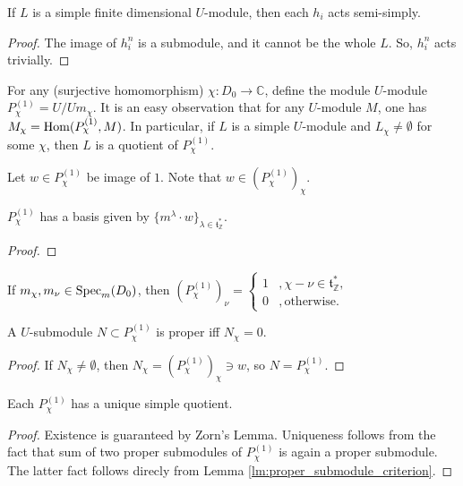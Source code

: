 \begin{corollary}
If $L$ is a simple finite dimensional $U$-module, then each $h_i$ acts semi-simply.
\end{corollary}

\begin{proof}
The image of $h_i^n$ is a submodule, and it cannot be the whole $L$. So, $h_i^n$ acts trivially.
\end{proof}

For any (surjective homomorphism) $\chi:D_0\to \mathbb{C}$, define the module $U$-module $P^{(1)}_\chi=U/Um_\chi$.
It is an easy observation that for any $U$-module $M$, one has $M_\chi={\rm Hom }(P_\chi^{(1)}, M)$. In particular, if $L$ is a simple $U$-module  and $L_\chi\neq \emptyset$ for some $\chi$, then $L$ is a quotient of $P_\chi^{(1)}$.

Let $w \in P_\chi^{(1)}$ be image of $1$. Note that $w\in (P_\chi^{(1)})_\chi $.

\begin{theorem}
$P_\chi^{(1)}$ has a basis given by $\{m^\lambda \cdot w\}_{\lambda\in \mathfrak{t}^*_{\mathbb{Z}}}$.
\end{theorem}
\begin{proof}

\end{proof}

\begin{corollary}
If $m_\chi,m_\nu\in {\rm Spec }_m(D_0)$, then $\left(P_\chi^{(1)}\right)_\nu=\left\{\begin{matrix}1&,\chi-\nu \in \mathfrak{t}^*_\mathbb{Z},\\0&,\textrm{otherwise}. \end{matrix}\right.$ 
\end{corollary}

\begin{lemma}\label{lm:proper_submodule_criterion}
A $U$-submodule $N\subset P_\chi^{(1)}$ is proper iff $N_\chi=0$.
\end{lemma}

\begin{proof}
If $N_\chi\neq\emptyset$, then $N_\chi=\left(P_\chi^{(1)}\right)_\chi\ni w$, so $N=P_\chi^{(1)}$.
\end{proof}

\begin{theorem}
Each $P_\chi^{(1)}$ has a unique simple quotient.
\end{theorem}
\begin{proof}
Existence is guaranteed by Zorn's Lemma. Uniqueness follows from the fact that sum of two proper submodules of $P_\chi^{(1)}$ is again a proper submodule. The latter fact follows direcly from Lemma \ref{lm:proper_submodule_criterion}.
\end{proof}

